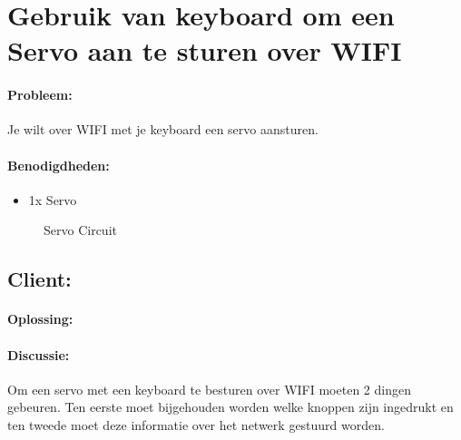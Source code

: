 \newpage
\section{Gebruik van keyboard om een Servo aan te sturen over WIFI}
\paragraph{Probleem:} Je wilt over WIFI met je keyboard een servo aansturen.

\paragraph{Benodigdheden:}
\begin{itemize}
	\item 1x Servo
\end{itemize}

\begin{figure}[H]
	\caption{Servo Circuit}
	\label{fig:ServoKeyboard}
\end{figure}


\subsection{Client:}\label{sub:KeyboardServoClient}
\paragraph{Oplossing:}



\paragraph{Discussie:} Om een servo met een keyboard te besturen over WIFI moeten 2 dingen gebeuren. Ten eerste moet bijgehouden worden welke knoppen zijn ingedrukt en ten tweede moet deze informatie over het netwerk gestuurd worden.\\\\

